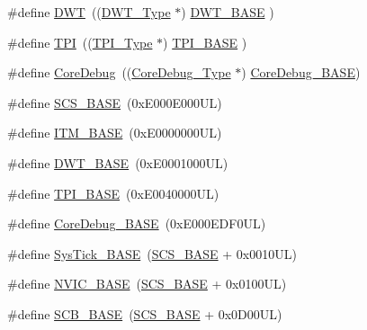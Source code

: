 \begin{DoxyCompactItemize}
\item 
\#define \hyperlink{group___c_m_s_i_s__core__base_gabbe5a060185e1d5afa3f85b14e10a6ce}{D\+WT}~((\hyperlink{struct_d_w_t___type}{D\+W\+T\+\_\+\+Type}       $\ast$)     \hyperlink{group___c_m_s_i_s__core__base_gafdab534f961bf8935eb456cb7700dcd2}{D\+W\+T\+\_\+\+B\+A\+SE}      )
\item 
\#define \hyperlink{group___c_m_s_i_s__core__base_ga8b4dd00016aed25a0ea54e9a9acd1239}{T\+PI}~((\hyperlink{struct_t_p_i___type}{T\+P\+I\+\_\+\+Type}       $\ast$)     \hyperlink{group___c_m_s_i_s__core__base_ga2b1eeff850a7e418844ca847145a1a68}{T\+P\+I\+\_\+\+B\+A\+SE}      )
\item 
\#define \hyperlink{group___c_m_s_i_s__core__base_gab6e30a2b802d9021619dbb0be7f5d63d}{Core\+Debug}~((\hyperlink{struct_core_debug___type}{Core\+Debug\+\_\+\+Type} $\ast$)     \hyperlink{group___c_m_s_i_s__core__base_ga680604dbcda9e9b31a1639fcffe5230b}{Core\+Debug\+\_\+\+B\+A\+SE})
\item 
\#define \hyperlink{group___c_m_s_i_s__core__base_ga3c14ed93192c8d9143322bbf77ebf770}{S\+C\+S\+\_\+\+B\+A\+SE}~(0x\+E000\+E000\+U\+L)
\item 
\#define \hyperlink{group___c_m_s_i_s__core__base_gadd76251e412a195ec0a8f47227a8359e}{I\+T\+M\+\_\+\+B\+A\+SE}~(0x\+E0000000\+U\+L)
\item 
\#define \hyperlink{group___c_m_s_i_s__core__base_gafdab534f961bf8935eb456cb7700dcd2}{D\+W\+T\+\_\+\+B\+A\+SE}~(0x\+E0001000\+U\+L)
\item 
\#define \hyperlink{group___c_m_s_i_s__core__base_ga2b1eeff850a7e418844ca847145a1a68}{T\+P\+I\+\_\+\+B\+A\+SE}~(0x\+E0040000\+U\+L)
\item 
\#define \hyperlink{group___c_m_s_i_s__core__base_ga680604dbcda9e9b31a1639fcffe5230b}{Core\+Debug\+\_\+\+B\+A\+SE}~(0x\+E000\+E\+D\+F0\+U\+L)
\item 
\#define \hyperlink{group___c_m_s_i_s__core__base_ga58effaac0b93006b756d33209e814646}{Sys\+Tick\+\_\+\+B\+A\+SE}~(\hyperlink{group___c_m_s_i_s__core__base_ga3c14ed93192c8d9143322bbf77ebf770}{S\+C\+S\+\_\+\+B\+A\+SE} +  0x0010\+U\+L)
\item 
\#define \hyperlink{group___c_m_s_i_s__core__base_gaa0288691785a5f868238e0468b39523d}{N\+V\+I\+C\+\_\+\+B\+A\+SE}~(\hyperlink{group___c_m_s_i_s__core__base_ga3c14ed93192c8d9143322bbf77ebf770}{S\+C\+S\+\_\+\+B\+A\+SE} +  0x0100\+U\+L)
\item 
\#define \hyperlink{group___c_m_s_i_s__core__base_gad55a7ddb8d4b2398b0c1cfec76c0d9fd}{S\+C\+B\+\_\+\+B\+A\+SE}~(\hyperlink{group___c_m_s_i_s__core__base_ga3c14ed93192c8d9143322bbf77ebf770}{S\+C\+S\+\_\+\+B\+A\+SE} +  0x0\+D00\+U\+L)

\end{DoxyCompactItemize}

